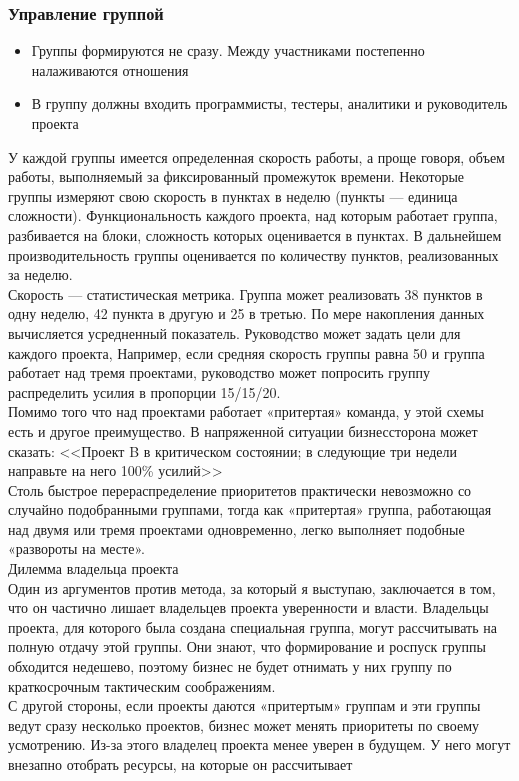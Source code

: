 \documentclass{../industrial-development}
\begin{document}
\begin{frame} \frametitle{Управление группой}
\begin{itemize}
  \item Группы формируются не сразу. Между участниками постепенно налаживаются отношения
  \item В группу должны входить программисты, тестеры, аналитики и руководитель проекта
\end{itemize}
\end{frame}
\lecturenotes
У каждой группы имеется определенная скорость работы, а проще говоря, объем работы, выполняемый за фиксированный промежуток времени. Некоторые группы измеряют свою скорость в пунктах в неделю
(пункты — единица сложности). Функциональность каждого проекта, над которым работает группа, разбивается на блоки, сложность которых оценивается в пунктах. В дальнейшем производительность группы оценивается по количеству пунктов, реализованных за неделю.\\
Скорость — статистическая метрика. Группа может реализовать 38 пунктов в одну неделю, 42 пункта в другую и 25 в третью. По мере накопления данных вычисляется усредненный показатель. Руководство может задать цели для каждого проекта, Например, если средняя скорость группы равна 50 и группа работает над тремя проектами, руководство может попросить группу распределить усилия
в пропорции 15/15/20.\\
Помимо того что над проектами работает «притертая» команда, у этой схемы есть и другое преимущество. В напряженной ситуации бизнессторона может сказать: <<Проект B в критическом состоянии; в следующие три недели направьте на него 100\% усилий>>\\
Столь быстрое перераспределение приоритетов практически невозможно со случайно подобранными группами, тогда как «притертая» группа, работающая над двумя или тремя проектами одновременно, легко выполняет подобные «развороты на месте».\\
Дилемма владельца проекта\\
Один из аргументов против метода, за который я выступаю, заключается в том, что он частично лишает владельцев проекта уверенности и власти. Владельцы проекта, для которого была создана специальная группа, могут рассчитывать на полную отдачу этой группы. Они знают, что формирование и роспуск группы обходится недешево, поэтому бизнес не будет отнимать у них группу по краткосрочным тактическим соображениям.\\
С другой стороны, если проекты даются «притертым» группам и эти группы ведут сразу несколько проектов, бизнес может менять приоритеты по своему усмотрению. Из-за этого владелец проекта менее уверен в будущем. У него могут внезапно отобрать ресурсы, на которые он рассчитывает
\end{document}
